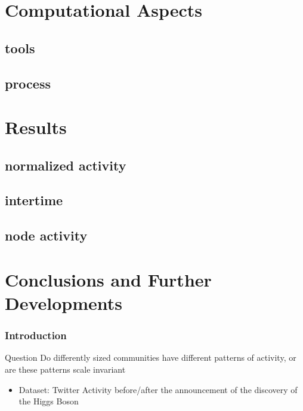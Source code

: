 \documentclass{beamer}
\begin{document}
\section{Computational Aspects}
\subsection{tools}
\subsection{process}
\section{Results}
\subsection{normalized activity}
\subsection{intertime}
\subsection{node activity}
\section{Conclusions and Further Developments}


\begin{frame}
\frametitle{Introduction}
\begin{block}{Question}
Do differently sized communities have different patterns of activity, or are these patterns scale invariant
\end{block}

\begin{itemize}
	\item Dataset: Twitter Activity before/after the announcement of the discovery of the Higgs Boson
\end{itemize}
\end{frame}

\end{document}

